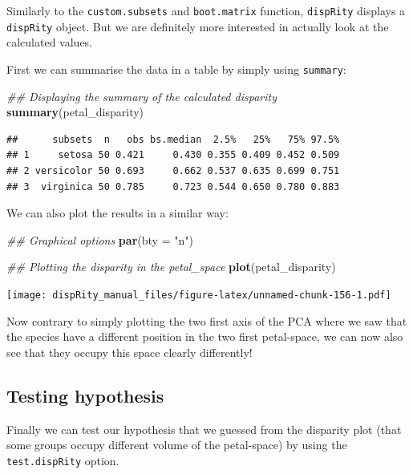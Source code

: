 \documentclass[]{book}
\newenvironment{Shaded}{\begin{snugshade}}{\end{snugshade}}
\newcommand{\CommentTok}[1]{\textcolor[rgb]{0.56,0.35,0.01}{\textit{#1}}}
\newcommand{\DataTypeTok}[1]{\textcolor[rgb]{0.13,0.29,0.53}{#1}}
\newcommand{\KeywordTok}[1]{\textcolor[rgb]{0.13,0.29,0.53}{\textbf{#1}}}
\newcommand{\NormalTok}[1]{#1}
\newcommand{\StringTok}[1]{\textcolor[rgb]{0.31,0.60,0.02}{#1}}
\begin{document}
Similarly to the \texttt{custom.subsets} and \texttt{boot.matrix} function, \texttt{dispRity} displays a \texttt{dispRity} object.
But we are definitely more interested in actually look at the calculated values.

First we can summarise the data in a table by simply using \texttt{summary}:

\begin{Shaded}
\begin{Highlighting}[]
\CommentTok{## Displaying the summary of the calculated disparity}
\KeywordTok{summary}\NormalTok{(petal_disparity)}
\end{Highlighting}
\end{Shaded}

\begin{verbatim}
##      subsets  n   obs bs.median  2.5%   25%   75% 97.5%
## 1     setosa 50 0.421     0.430 0.355 0.409 0.452 0.509
## 2 versicolor 50 0.693     0.662 0.537 0.635 0.699 0.751
## 3  virginica 50 0.785     0.723 0.544 0.650 0.780 0.883
\end{verbatim}

We can also plot the results in a similar way:

\begin{Shaded}
\begin{Highlighting}[]
\CommentTok{## Graphical options}
\KeywordTok{par}\NormalTok{(}\DataTypeTok{bty =} \StringTok{"n"}\NormalTok{)}

\CommentTok{## Plotting the disparity in the petal_space}
\KeywordTok{plot}\NormalTok{(petal_disparity)}
\end{Highlighting}
\end{Shaded}

\texttt{[image: dispRity\_manual\_files/figure-latex/unnamed-chunk-156-1.pdf]}

Now contrary to simply plotting the two first axis of the PCA where we saw that the species have a different position in the two first petal-space, we can now also see that they occupy this space clearly differently!

\hypertarget{testing-hypothesis}{%
\subsection{Testing hypothesis}\label{testing-hypothesis}}

Finally we can test our hypothesis that we guessed from the disparity plot (that some groups occupy different volume of the petal-space) by using the \texttt{test.dispRity} option.
\end{document}

